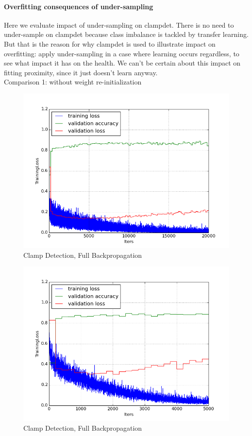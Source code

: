 \documentclass[a4paper,11pt]{article}
\begin{document}
\paragraph{Overfitting consequences of under-sampling}

Here we evaluate impact of under-sampling on clampdet. There is no need to under-sample on clampdet because class imbalance is tackled by transfer learning. But that is the reason for why clampdet is used to illustrate impact on overfitting: apply under-sampling in a case where learning occurs regardless, to see what impact it has on the health. We can't be certain about this impact on fitting proximity, since it just doesn't learn anyway. \\

Comparison 1: without weight re-initialization

\begin{figure}[h!]
	\centering
	\includegraphics[scale=0.5]{images/plot_clampdet_none.png}
	\caption{Clamp Detection, Full Backpropagation}
\end{figure}

\begin{figure}[h!]
	\centering
	\includegraphics[scale=0.5]{images/plot_clampdet_us_none.png}
	\caption{Clamp Detection, Full Backpropagation}
\end{figure}
\end{document}
